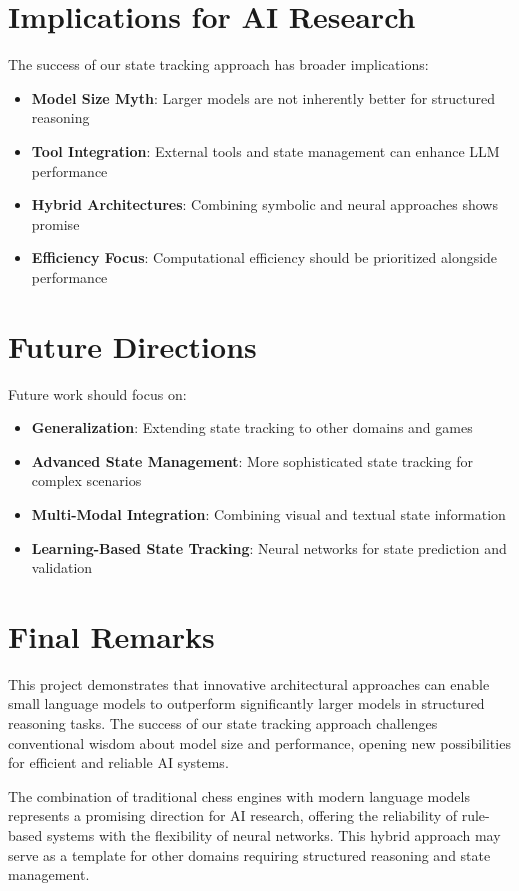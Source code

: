 \documentclass[11pt,a4paper]{report}
\begin{document}
\section{Implications for AI Research}
The success of our state tracking approach has broader implications:

\begin{itemize}
    \item \textbf{Model Size Myth}: Larger models are not inherently better for structured reasoning
    \item \textbf{Tool Integration}: External tools and state management can enhance LLM performance
    \item \textbf{Hybrid Architectures}: Combining symbolic and neural approaches shows promise
    \item \textbf{Efficiency Focus}: Computational efficiency should be prioritized alongside performance
\end{itemize}

\section{Future Directions}
Future work should focus on:

\begin{itemize}
    \item \textbf{Generalization}: Extending state tracking to other domains and games
    \item \textbf{Advanced State Management}: More sophisticated state tracking for complex scenarios
    \item \textbf{Multi-Modal Integration}: Combining visual and textual state information
    \item \textbf{Learning-Based State Tracking}: Neural networks for state prediction and validation
\end{itemize}

\section{Final Remarks}
This project demonstrates that innovative architectural approaches can enable small language models to outperform significantly larger models in structured reasoning tasks. The success of our state tracking approach challenges conventional wisdom about model size and performance, opening new possibilities for efficient and reliable AI systems.

The combination of traditional chess engines with modern language models represents a promising direction for AI research, offering the reliability of rule-based systems with the flexibility of neural networks. This hybrid approach may serve as a template for other domains requiring structured reasoning and state management.
\end{document}
